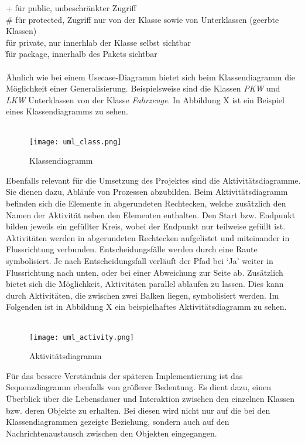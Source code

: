      + für public, unbeschränkter Zugriff\\
     \# für protected, Zugriff nur von der Klasse sowie von Unterklassen (geerbte Klassen)\\
     \- für private, nur innerhlab der Klasse selbst sichtbar\\
     \~ für package, innerhalb des Pakets sichtbar\\
\\
Ähnlich wie bei einem Usecase-Diagramm bietet sich beim Klassendiagramm die Möglichkeit einer Generalisierung.
Beispielsweise sind die Klassen \textit{PKW} und \textit{LKW} Unterklassen von der Klasse \textit{Fahrzeuge}. In Abbildung X ist ein Beispiel eines Klassendiagramms zu sehen.\\
\\
\begin{figure}[H]
\centering
\texttt{[image: uml\_class.png]}
\caption{Klassendiagramm}
\label{fig:show_s1_s2_p1_n1}
\end{figure}
Ebenfalls relevant für die Umsetzung des Projektes sind die Aktivitätsdiagramme.
Sie dienen dazu, Abläufe von Prozessen abzubilden.
Beim Aktivitätsdiagramm befinden sich die Elemente in abgerundeten Rechtecken, welche zusätzlich den Namen der Aktivität neben den Elementen enthalten.
Den Start bzw. Endpunkt bilden jeweils ein gefüllter Kreis, wobei der Endpunkt nur teilweise gefüllt ist. Aktivitäten werden in abgerundeten Rechtecken aufgelistet und miteinander in Flussrichtung verbunden. Entscheidungsfälle werden durch eine Raute symbolisiert.
Je nach Entscheidungsfall verläuft der Pfad bei ‘Ja’ weiter in Flussrichtung nach unten, oder bei einer Abweichung zur Seite ab.
Zusätzlich bietet sich die Möglichkeit, Aktivitäten parallel ablaufen zu lassen.
Dies kann durch Aktivitäten, die zwischen zwei Balken liegen, symbolisiert werden.
Im Folgenden ist in Abbildung X ein beispielhaftes Aktivitätsdiagramm zu sehen.\\
\\
\begin{figure}[H]
\centering
\texttt{[image: uml\_activity.png]}
\caption{Aktivitätsdiagramm}
\label{fig:show_s1_s2_p1_n1}
\end{figure}
Für das bessere Verständnis der späteren Implementierung ist das Sequenzdiagramm ebenfalls von größerer Bedeutung. Es dient dazu, einen Überblick über die Lebensdauer und Interaktion zwischen den einzelnen Klassen bzw. deren Objekte zu erhalten.
Bei diesen wird nicht nur auf die bei den Klassendiagrammen gezeigte Beziehung, sondern auch auf den Nachrichtenaustausch zwischen den Objekten eingegangen.
